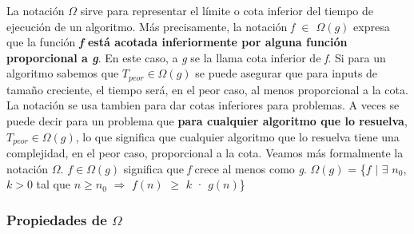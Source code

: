 \documentclass[10pt,a4paper]{article}
\begin{document}
La notación $\Omega$ sirve para representar el límite o cota inferior del tiempo de ejecución de un algoritmo.
\newline
\newline
Más precisamente, la notación \textit{f $\in$ $\Omega(g)$} expresa que la función \textbf{\textit{f} está acotada inferiormente por alguna función proporcional a \textit{g}}.
\newline
\newline
En este caso, a \textit{g} se la llama cota inferior de \textit{f}.
\newline
\newline
Si para un algoritmo sabemos que $T_{peor} \in \Omega(g)$ se puede asegurar que para inputs de tamaño creciente, el tiempo será, en el peor caso, al menos proporcional a la cota.
\newline
\newline
La notación se usa tambien para dar cotas inferiores para problemas. A veces se puede decir para un problema que \textbf{para cualquier algoritmo que lo resuelva}, $T_{peor} \in \Omega(g)$, lo que significa que cualquier algoritmo que lo resuelva tiene una complejidad, en el peor caso, proporcional a la cota.
\newline
\newline
Veamos más formalmente la notación $\Omega$.
\newline
\newline
$f \in \Omega(g)$ significa que \textit{f} crece al menos como \textit{g}.  
\newline
\newline
$\Omega(g)$ = \{$f$ $|$ $\exists$ $n_{0}$, $k > 0$ tal que $n \geq n_{0}$ $\Rightarrow$ $f(n)$ $\geq$ $k$ · $g(n)$\} 

\subsubsection{Propiedades de $\Omega$}
\end{document}
